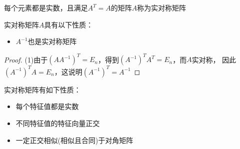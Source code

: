 \begin{definition}[实对称矩阵]
  每个元素都是实数，且满足$A^T = A$的矩阵$A$称为实对称矩阵
\end{definition}

\begin{theorem}[实对称矩阵的矩阵性质]
  实对称矩阵$A$具有以下性质：
  \begin{itemize}
  \item $A^{-1}$也是实对称矩阵
  \end{itemize}
\end{theorem}

\begin{proof}
  (1)由于$(AA^{-1})^T = E_n$，得到$(A^{-1})^TA^T = E_n$，而$A$实对称，
  因此$(A^{-1})^TA = E_n$，这说明$(A^{-1})^T = A^{-1}$
\end{proof}

\begin{theorem}[实对称矩阵的特征值性质]
  实对称矩阵有如下性质：
  \begin{itemize}
  \item 每个特征值都是实数
  \item 不同特征值的特征向量正交
  \item 一定正交相似(相似且合同)于对角矩阵
  \end{itemize}
\end{theorem}

